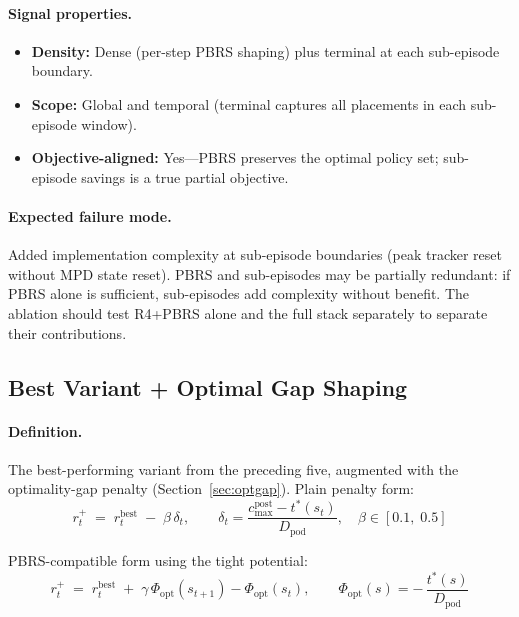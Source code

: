 \documentclass[11pt]{article}
\begin{document}
\paragraph{Signal properties.}
\begin{itemize}
  \item \textbf{Density:} Dense (per-step PBRS shaping) plus terminal at
        each sub-episode boundary.
  \item \textbf{Scope:} Global and temporal (terminal captures all
        placements in each sub-episode window).
  \item \textbf{Objective-aligned:} Yes---PBRS preserves the optimal policy
        set; sub-episode savings is a true partial objective.
\end{itemize}

\paragraph{Expected failure mode.}
Added implementation complexity at sub-episode boundaries (peak tracker
reset without MPD state reset).  PBRS and sub-episodes may be partially
redundant: if PBRS alone is sufficient, sub-episodes add complexity without
benefit.  The ablation should test R4+PBRS alone and the full stack
separately to separate their contributions.

\subsection{Best Variant + Optimal Gap Shaping}
\label{sec:r4opt}

\paragraph{Definition.}
The best-performing variant from the preceding five, augmented with the
optimality-gap penalty (Section~\ref{sec:optgap}).  Plain penalty form:
\begin{equation}
\boxed{
  r_t^+
  \;=\;
  r_t^{\text{best}} \;-\; \beta\,\delta_t,
  \qquad
  \delta_t = \frac{c_{\max}^{\text{post}} - t^*(s_t)}{D_{\text{pod}}},
  \quad \beta \in [0.1,\; 0.5]
}
\label{eq:r4opt}
\end{equation}

PBRS-compatible form using the tight potential:
\begin{equation}
  r_t^+
  \;=\;
  r_t^{\text{best}}
  \;+\;
  \gamma\,\Phi_{\text{opt}}(s_{t+1}) - \Phi_{\text{opt}}(s_t),
  \qquad
  \Phi_{\text{opt}}(s) = -\,\frac{t^*(s)}{D_{\text{pod}}}
  \label{eq:r4opt-pbrs}
\end{equation}
\end{document}
